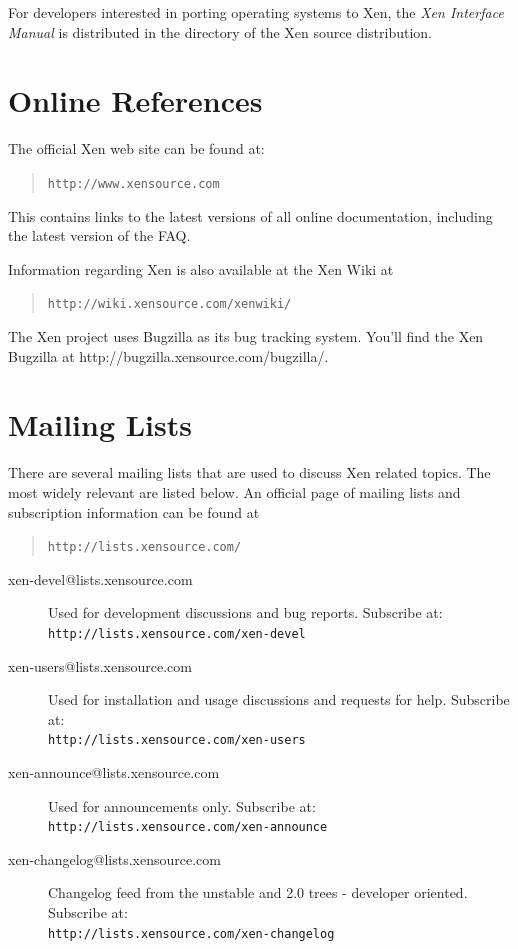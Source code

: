 \documentclass[11pt,twoside,final,openright]{report}
\begin{document}
For developers interested in porting operating systems to Xen, the
\emph{Xen Interface Manual} is distributed in the 
directory of the Xen source distribution.


\section{Online References}

The official Xen web site can be found at:
\begin{quote} {\tt http://www.xensource.com}
\end{quote}

This contains links to the latest versions of all online
documentation, including the latest version of the FAQ.

Information regarding Xen is also available at the Xen Wiki at
\begin{quote} {\tt http://wiki.xensource.com/xenwiki/}\end{quote}
The Xen project uses Bugzilla as its bug tracking system. You'll find
the Xen Bugzilla at http://bugzilla.xensource.com/bugzilla/.


\section{Mailing Lists}

There are several mailing lists that are used to discuss Xen related
topics. The most widely relevant are listed below. An official page of
mailing lists and subscription information can be found at \begin{quote}
  {\tt http://lists.xensource.com/} \end{quote}

\begin{description}
\item[xen-devel@lists.xensource.com] Used for development
  discussions and bug reports.  Subscribe at: \\
  {\small {\tt http://lists.xensource.com/xen-devel}}
\item[xen-users@lists.xensource.com] Used for installation and usage
  discussions and requests for help.  Subscribe at: \\
  {\small {\tt http://lists.xensource.com/xen-users}}
\item[xen-announce@lists.xensource.com] Used for announcements only.
  Subscribe at: \\
  {\small {\tt http://lists.xensource.com/xen-announce}}
\item[xen-changelog@lists.xensource.com] Changelog feed
  from the unstable and 2.0 trees - developer oriented.  Subscribe at: \\
  {\small {\tt http://lists.xensource.com/xen-changelog}}
\end{description}
\end{document}
